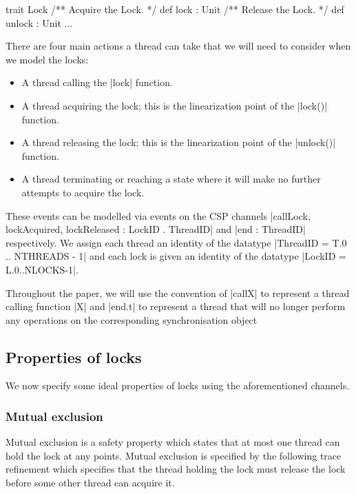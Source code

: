 \begin{scala}[caption={A Scala interface for a simple lock},label={code:LockInterface}]
trait Lock{
  /** Acquire the Lock. */
  def lock : Unit
  /** Release the Lock. */
  def unlock : Unit 
  ...
}
\end{scala}



There are four main actions a thread can take that we will need to consider when we model the locks:

\begin{itemize}
  \item A thread calling the |lock| function.
  \item A thread acquiring the lock; this is the linearization point of the |lock()| function.
  \item A thread releasing the lock; this is the linearization point of the |unlock()| function.
  \item A thread terminating or reaching a state where it will make no further attempts to acquire the lock.
\end{itemize}

These events can be modelled via events on the CSP channels \newline |callLock, lockAcquired, lockReleased : LockID . ThreadID| and |end : ThreadID| respectively. We assign each thread an identity of the datatype |ThreadID = T.{0 .. NTHREADS - 1}| and each lock is given an identity of the datatype |LockID = L.{0..NLOCKS-1}|.

Throughout the paper, we will use the convention of |callX| to represent a thread calling function |X| and |end.t| to represent a thread that will no longer perform any operations on the corresponding synchronisation object 

\subsection{Properties of locks}\label{section:lock-properties}

We now specify some ideal properties of locks using the aforementioned channels.

\subsubsection{Mutual exclusion}\label{mutual-exclusion}
Mutual exclusion is a safety property which states that at most one thread can hold the lock at any points. Mutual exclusion is specified by the following trace refinement which specifies that the thread holding the lock must release the lock before some other thread can acquire it.

